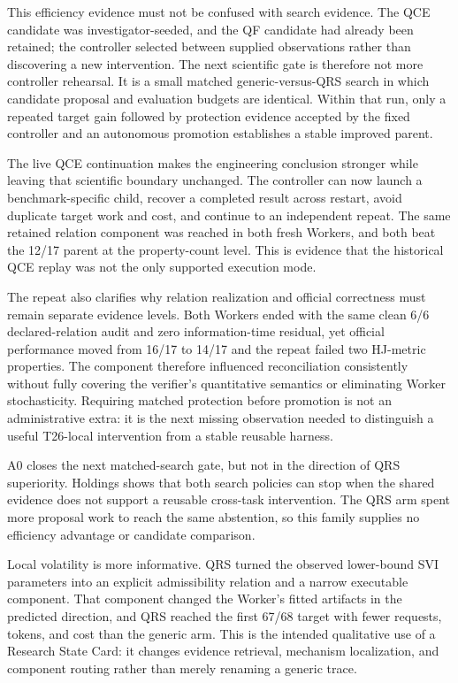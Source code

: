 This efficiency evidence must not be confused with search evidence. The QCE
candidate was investigator-seeded, and the QF candidate had already been
retained; the controller selected between supplied observations rather than
discovering a new intervention. The next scientific gate is therefore not
more controller rehearsal. It is a small matched generic-versus-QRS search in
which candidate proposal and evaluation budgets are identical. Within that
run, only a repeated target gain followed by protection evidence accepted by
the fixed controller and an autonomous promotion establishes a stable improved
parent.

The live QCE continuation makes the engineering conclusion stronger while
leaving that scientific boundary unchanged. The controller can now launch a
benchmark-specific child, recover a completed result across restart, avoid
duplicate target work and cost, and continue to an independent repeat. The
same retained relation component was reached in both fresh Workers, and both
beat the 12/17 parent at the property-count level. This is evidence that the
historical QCE replay was not the only supported execution mode.

The repeat also clarifies why relation realization and official correctness
must remain separate evidence levels. Both Workers ended with the same clean
6/6 declared-relation audit and zero information-time residual, yet official
performance moved from 16/17 to 14/17 and the repeat failed two HJ-metric
properties. The component therefore influenced reconciliation consistently
without fully covering the verifier's quantitative semantics or eliminating
Worker stochasticity. Requiring matched protection before promotion is not an
administrative extra: it is the next missing observation needed to distinguish
a useful T26-local intervention from a stable reusable harness.

A0 closes the next matched-search gate, but not in the direction of QRS
superiority. Holdings shows that both search policies can stop when the shared
evidence does not support a reusable cross-task intervention. The QRS arm spent
more proposal work to reach the same abstention, so this family supplies no
efficiency advantage or candidate comparison.

Local volatility is more informative. QRS turned the observed lower-bound SVI
parameters into an explicit admissibility relation and a narrow executable
component. That component changed the Worker's fitted artifacts in the
predicted direction, and QRS reached the first 67/68 target with fewer requests,
tokens, and cost than the generic arm. This is the intended qualitative use of
a Research State Card: it changes evidence retrieval, mechanism localization,
and component routing rather than merely renaming a generic trace.


